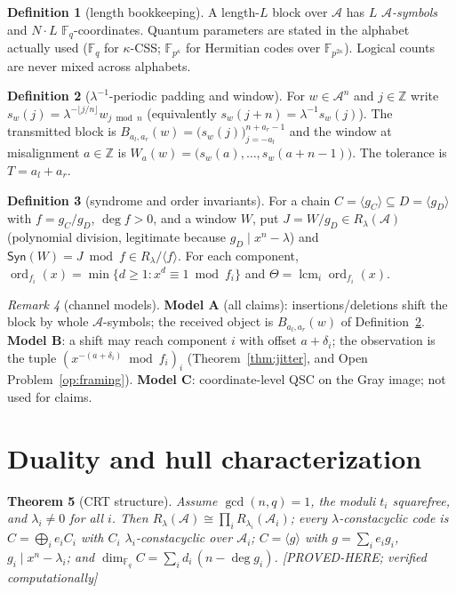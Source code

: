 \documentclass[11pt]{article}
\newtheorem{theorem}{Theorem}[section]
\theoremstyle{definition}
\newtheorem{definition}[theorem]{Definition}
\theoremstyle{remark}
\newtheorem{remark}[theorem]{Remark}
\theoremstyle{plain}
\newcommand{\Fq}{\mathbb{F}_q}
\newcommand{\Aalg}{\mathcal{A}}
\newcommand{\Rlam}{R_{\lambda}}
\newcommand{\ord}{\operatorname{ord}}
\newcommand{\lcm}{\operatorname{lcm}}
\newcommand{\Tol}{T}
\newcommand{\Th}{\Theta}
\newcommand{\Syn}{\mathsf{Syn}}
\newcommand{\status}[1]{\textnormal{\footnotesize[#1]}}
\begin{document}
\begin{definition}[length bookkeeping]\label{def:length}
A length-$L$ block over $\Aalg$ has $L$ \emph{$\Aalg$-symbols} and $N\cdot L$
$\Fq$-coordinates. Quantum parameters are stated in the alphabet actually used
($\Fq$ for $\kappa$-CSS; $\mathbb{F}_{p^\kappa}$ for Hermitian codes over
$\mathbb{F}_{p^{2\kappa}}$). Logical counts are never mixed across alphabets.
\end{definition}

\begin{definition}[$\lambda^{-1}$-periodic padding and window]\label{def:pad}
For $w\in\Aalg^n$ and $j\in\mathbb{Z}$ write $s_w(j)=\lambda^{-\lfloor j/n\rfloor}w_{j\bmod n}$
(equivalently $s_w(j+n)=\lambda^{-1}s_w(j)$). The transmitted block is
$B_{a_l,a_r}(w)=\big(s_w(j)\big)_{j=-a_l}^{n+a_r-1}$ and the window at misalignment
$a\in\mathbb{Z}$ is $W_a(w)=\big(s_w(a),\dots,s_w(a+n-1)\big)$. The tolerance is
$\Tol=a_l+a_r$.
\end{definition}

\begin{definition}[syndrome and order invariants]\label{def:syn}
For a chain $C=\langle g_C\rangle\subseteq D=\langle g_D\rangle$ with $f=g_C/g_D$,
$\deg f>0$, and a window $W$, put $J=W/g_D\in\Rlam(\Aalg)$ (polynomial division, legitimate
because $g_D\mid x^n-\lambda$) and $\Syn(W)=J\bmod f\in\Rlam/\langle f\rangle$. For each
component, $\ord_{f_i}(x)=\min\{d\ge1:x^d\equiv1\bmod f_i\}$ and
$\Th=\lcm_i\ord_{f_i}(x)$.
\end{definition}

\begin{remark}[channel models]\label{rem:models}
\textbf{Model A} (all claims): insertions/deletions shift the block by whole $\Aalg$-symbols;
the received object is $B_{a_l,a_r}(w)$ of Definition~\ref{def:pad}.
\textbf{Model B}: a shift may reach component $i$ with offset $a+\delta_i$; the observation is
the tuple $(x^{-(a+\delta_i)}\bmod f_i)_i$ (Theorem~\ref{thm:jitter}, and Open
Problem~\ref{op:framing}).
\textbf{Model C}: coordinate-level QSC on the Gray image; not used for claims.
\end{remark}

\section{Duality and hull characterization}\label{sec:duality}

\begin{theorem}[CRT structure]\label{thm:struct}
Assume $\gcd(n,q)=1$, the moduli $t_i$ squarefree, and $\lambda_i\ne0$ for all $i$. Then
$\Rlam(\Aalg)\cong\prod_iR_{\lambda_i}(\Aalg_i)$; every $\lambda$-constacyclic code is
$C=\bigoplus_ie_iC_i$ with $C_i$ $\lambda_i$-constacyclic over $\Aalg_i$; $C=\langle g\rangle$
with $g=\sum_ie_ig_i$, $g_i\mid x^n-\lambda_i$; and
$\dim_{\Fq}C=\sum_i d_i\,(n-\deg g_i)$.
\status{PROVED-HERE; verified computationally}
\end{theorem}
\end{document}
